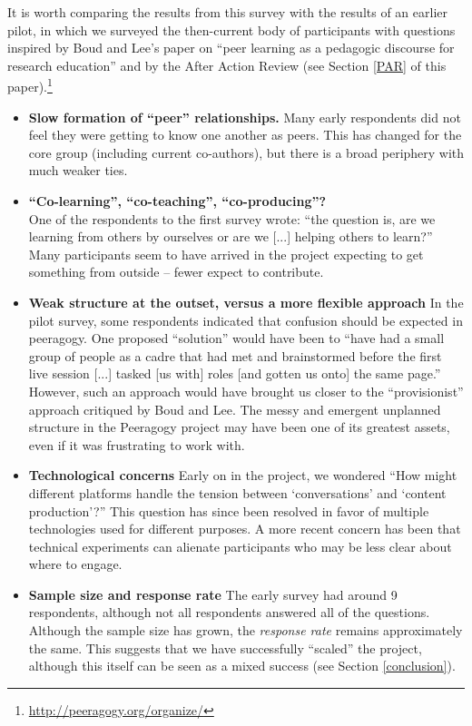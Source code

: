 \documentclass{acm_proc_article-sp}
\begin{document}
It is worth comparing the results from this survey with the results of an earlier pilot, in which we surveyed the then-current body of participants with questions inspired by Boud and Lee's paper on ``peer learning as a pedagogic discourse for research education'' \cite{boud2005peer} and by the After Action Review (see Section \ref{PAR} of this paper).\footnote{\url{http://peeragogy.org/organize/}}
\begin{itemize}
\item {\bf Slow formation of ``peer'' relationships.}  Many early respondents did not feel they were getting to know one another as peers.  This has changed for the core group (including current co-authors), but there is a broad periphery with much weaker ties.
\item {\bf ``Co-learning'', ``co-teaching'', ``co-producing''?} \\ One of the respondents to the first survey wrote: ``the question is, are we learning from others by ourselves or are we [...] helping others to learn?''   Many participants seem to have arrived in the project expecting to get something from outside -- fewer expect to contribute. 
\item {\bf Weak structure at the outset, versus a more flexible approach}  In the pilot survey, some respondents indicated that confusion should be expected in peeragogy.  One proposed ``solution'' would have been to ``have had a small group of people as a cadre that had met and brainstormed before the first live session [...] tasked [us with] roles [and gotten us onto] the same page.''  However, such an approach would have brought us closer to the ``provisionist'' approach critiqued by Boud and Lee.  The messy and emergent unplanned structure in the Peeragogy project may have been one of its greatest assets, even if it was frustrating to work with.
\item {\bf Technological concerns}  Early on in the project, we wondered ``How might different platforms handle the tension between `conversations' and `content production'?''  This question has since been resolved in favor of multiple technologies used for different purposes.  A more recent concern has been that technical experiments can alienate participants who may be less clear about where to engage. 
\item {\bf Sample size and response rate}  The early survey had around 9 respondents, although not all respondents answered all of the questions.  Although the sample size has grown, the \emph{response rate} remains approximately the same.  This suggests that we have successfully ``scaled'' the project, although this itself can be seen as a mixed success (see Section \ref{conclusion}).
\end{itemize}
\end{document}

